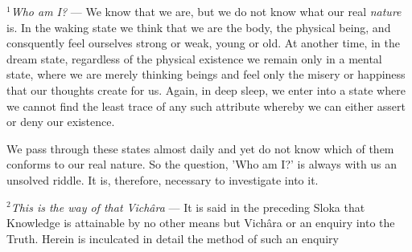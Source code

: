 \documentclass{article}
\begin{document}
{\small\textit{$^1$Who am I?} --- We know that we are, but we do not
know what our real \textit{nature} is. In the waking state we think that we are
the body, the physical being, and consquently feel ourselves strong or weak,
young or old. At another time, in the dream state, regardless of the physical
existence we remain only in a mental state, where we are merely thinking beings
and feel only the misery or happiness that our thoughts create for us. Again,
in deep sleep, we enter into a state where we cannot find the least trace of
any such attribute whereby we can either assert or deny our existence.

We pass through these states almost daily and yet do not know which of them
conforms to our real nature. So the question, 'Who am I?' is always with us an
unsolved riddle. It is, therefore, necessary to investigate into it.

\textit{$^2$This is the way of that Vichâra} --- It is said in the preceding
Sloka that Knowledge is attainable by no other means but Vichâra or an enquiry
into the Truth. Herein is inculcated in detail the method of such an enquiry }


\bigskip
\end{document}
